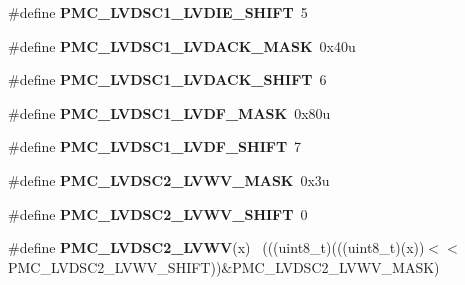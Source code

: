 \begin{DoxyCompactItemize}
\item 
\hypertarget{group___p_m_c___register___masks_ga30ca240c9254a7e76123a3cf2bfdc40e}{}\#define {\bfseries P\+M\+C\+\_\+\+L\+V\+D\+S\+C1\+\_\+\+L\+V\+D\+I\+E\+\_\+\+S\+H\+I\+F\+T}~5\label{group___p_m_c___register___masks_ga30ca240c9254a7e76123a3cf2bfdc40e}

\item 
\hypertarget{group___p_m_c___register___masks_ga65d04677ca16ad916563d6673cb8ecaa}{}\#define {\bfseries P\+M\+C\+\_\+\+L\+V\+D\+S\+C1\+\_\+\+L\+V\+D\+A\+C\+K\+\_\+\+M\+A\+S\+K}~0x40u\label{group___p_m_c___register___masks_ga65d04677ca16ad916563d6673cb8ecaa}

\item 
\hypertarget{group___p_m_c___register___masks_ga56654042b7934ca0e6c51f21db7d1201}{}\#define {\bfseries P\+M\+C\+\_\+\+L\+V\+D\+S\+C1\+\_\+\+L\+V\+D\+A\+C\+K\+\_\+\+S\+H\+I\+F\+T}~6\label{group___p_m_c___register___masks_ga56654042b7934ca0e6c51f21db7d1201}

\item 
\hypertarget{group___p_m_c___register___masks_ga44ae12d2d3e732cd25a897092a7e9ada}{}\#define {\bfseries P\+M\+C\+\_\+\+L\+V\+D\+S\+C1\+\_\+\+L\+V\+D\+F\+\_\+\+M\+A\+S\+K}~0x80u\label{group___p_m_c___register___masks_ga44ae12d2d3e732cd25a897092a7e9ada}

\item 
\hypertarget{group___p_m_c___register___masks_ga75efd4534766aaa126efff96d241de61}{}\#define {\bfseries P\+M\+C\+\_\+\+L\+V\+D\+S\+C1\+\_\+\+L\+V\+D\+F\+\_\+\+S\+H\+I\+F\+T}~7\label{group___p_m_c___register___masks_ga75efd4534766aaa126efff96d241de61}

\item 
\hypertarget{group___p_m_c___register___masks_gaab1198a446bb9b8412589eeb12311666}{}\#define {\bfseries P\+M\+C\+\_\+\+L\+V\+D\+S\+C2\+\_\+\+L\+V\+W\+V\+\_\+\+M\+A\+S\+K}~0x3u\label{group___p_m_c___register___masks_gaab1198a446bb9b8412589eeb12311666}

\item 
\hypertarget{group___p_m_c___register___masks_gabd2e288b833d9e66c422b814dc7b5f03}{}\#define {\bfseries P\+M\+C\+\_\+\+L\+V\+D\+S\+C2\+\_\+\+L\+V\+W\+V\+\_\+\+S\+H\+I\+F\+T}~0\label{group___p_m_c___register___masks_gabd2e288b833d9e66c422b814dc7b5f03}

\item 
\hypertarget{group___p_m_c___register___masks_ga3b387aadc1c71cc6a7f6a8199d062b2c}{}\#define {\bfseries P\+M\+C\+\_\+\+L\+V\+D\+S\+C2\+\_\+\+L\+V\+W\+V}(x)                                          ~(((uint8\+\_\+t)(((uint8\+\_\+t)(x))$<$$<$P\+M\+C\+\_\+\+L\+V\+D\+S\+C2\+\_\+\+L\+V\+W\+V\+\_\+\+S\+H\+I\+F\+T))\&P\+M\+C\+\_\+\+L\+V\+D\+S\+C2\+\_\+\+L\+V\+W\+V\+\_\+\+M\+A\+S\+K)\label{group___p_m_c___register___masks_ga3b387aadc1c71cc6a7f6a8199d062b2c}


\end{DoxyCompactItemize}
